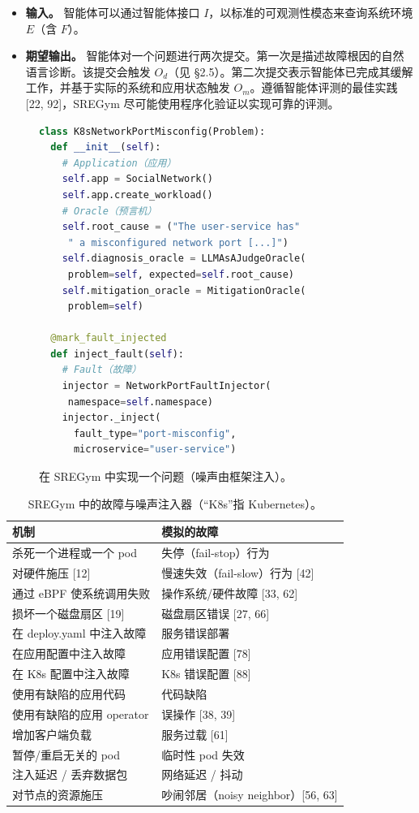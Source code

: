 \documentclass[11pt,UTF8,fontset=fandol]{ctexart}
\begin{document}
\begin{itemize}[leftmargin=1.5em]
\item \textbf{输入。} 智能体可以通过智能体接口 $I$，以标准的可观测性模态来查询系统环境 $E$（含 $F$）。
\item \textbf{期望输出。} 智能体对一个问题进行两次提交。第一次是描述故障根因的自然语言诊断。该提交会触发 $O_d$（见 §2.5）。第二次提交表示智能体已完成其缓解工作，并基于实际的系统和应用状态触发 $O_m$。遵循智能体评测的最佳实践 [22, 92]，SREGym 尽可能使用程序化验证以实现可靠的评测。
\end{itemize}

\begin{figure}[H]\centering
\begin{lstlisting}[language=Python]
class K8sNetworkPortMisconfig(Problem):
  def __init__(self):
    # Application（应用）
    self.app = SocialNetwork()
    self.app.create_workload()
    # Oracle（预言机）
    self.root_cause = ("The user-service has"
     " a misconfigured network port [...]")
    self.diagnosis_oracle = LLMAsAJudgeOracle(
     problem=self, expected=self.root_cause)
    self.mitigation_oracle = MitigationOracle(
     problem=self)

  @mark_fault_injected
  def inject_fault(self):
    # Fault（故障）
    injector = NetworkPortFaultInjector(
     namespace=self.namespace)
    injector._inject(
      fault_type="port-misconfig",
      microservice="user-service")
\end{lstlisting}
\caption{在 SREGym 中实现一个问题（噪声由框架注入）。}
\label{fig:3}
\end{figure}

\begin{table}[H]\centering
\caption{SREGym 中的故障与噪声注入器（“K8s”指 Kubernetes）。}
\label{tab:1}
\begin{tabular}{ll}
\toprule
机制 & 模拟的故障 \\
\midrule
杀死一个进程或一个 pod & 失停（fail-stop）行为 \\
对硬件施压 [12] & 慢速失效（fail-slow）行为 [42] \\
通过 eBPF 使系统调用失败 & 操作系统/硬件故障 [33, 62] \\
损坏一个磁盘扇区 [19] & 磁盘扇区错误 [27, 66] \\
在 deploy.yaml 中注入故障 & 服务错误部署 \\
在应用配置中注入故障 & 应用错误配置 [78] \\
在 K8s 配置中注入故障 & K8s 错误配置 [88] \\
使用有缺陷的应用代码 & 代码缺陷 \\
使用有缺陷的应用 operator & 误操作 [38, 39] \\
增加客户端负载 & 服务过载 [61] \\
暂停/重启无关的 pod & 临时性 pod 失效 \\
注入延迟 / 丢弃数据包 & 网络延迟 / 抖动 \\
对节点的资源施压 & 吵闹邻居（noisy neighbor）[56, 63] \\
\bottomrule
\end{tabular}
\end{table}
\end{document}

